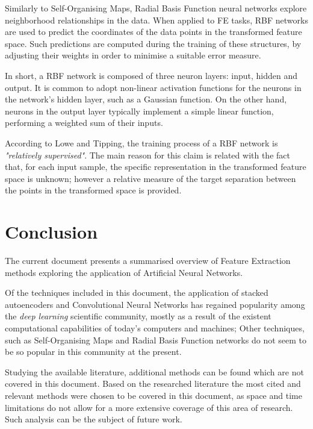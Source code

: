 \documentclass[9pt,journal,compsoc]{IEEEtran}
\begin{document}
Similarly to Self-Organising Maps, Radial Basis Function neural networks explore neighborhood relationships in the data. When applied to FE tasks, RBF networks are used to predict the coordinates of the data points in the transformed feature space. Such predictions are computed during the training of these structures, by adjusting their weights in order to minimise a suitable error measure.

In short, a RBF network is composed of three neuron layers: input, hidden and output. It is common to adopt non-linear activation functions for the neurons in the network's hidden layer, such as a Gaussian function. On the other hand, neurons in the output layer typically implement a simple linear function, performing a weighted sum of their inputs.

According to Lowe and Tipping\cite{lowe1997neuroscale}, the training process of a RBF network is \emph{"relatively supervised"}. The main reason for this claim is related with the fact that, for each input sample, the specific representation in the transformed feature space is unknown; however a relative measure of the target separation between the points in the transformed space is provided.

\section{Conclusion}\label{sec:conclusion}

The current document presents a summarised overview of Feature Extraction methods exploring the application of Artificial Neural Networks.

Of the techniques included in this document, the application of stacked autoencoders and Convolutional Neural Networks has regained popularity among the \emph{deep learning} scientific community, mostly as a result of the existent computational capabilities of today's computers and machines; Other techniques, such as Self-Organising Maps and Radial Basis Function networks do not seem to be so popular in this community at the present.

Studying the available literature, additional methods can be found which are not covered in this document. Based on the researched literature the most cited and relevant methods were chosen to be covered in this document, as space and time limitations do not allow for a more extensive coverage of this area of research. Such analysis can be the subject of future work.



\end{document}
